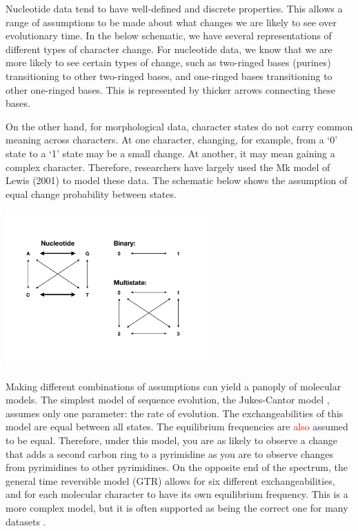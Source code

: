 \documentclass[11pt]{article}
\makeatletter
\newcommand{\edit}[1]{{\textcolor{red}{#1}}} %
\newenvironment{boxedtext}[1]{%
  \begin{mdframed}[frametitle=#1,
    frametitlefont=\scshape\mdseries\sffamily,
    frametitlealignment=\centering,
    backgroundcolor=black!20,
    hidealllines=true,
    innerleftmargin=11\p@,innerrightmargin=11\p@,
    frametitleaboveskip=0.5\baselineskip,
    innerbottommargin=0.5\baselineskip,
    skipabove=\baselineskip,skipbelow=0.5\baselineskip]
}{%
  \end{mdframed}%
}
\makeatother
\begin{document}
\begin{boxedtext}{Molecules and Morphology}

Nucleotide data tend to have well-defined and discrete properties.
This allows a range of assumptions to be made about what changes we are likely to see over evolutionary time.
In the below schematic, we have several representations of different types of character change.
For nucleotide data, we know that we are more likely to see certain types of change, such as two-ringed bases (purines) transitioning to other two-ringed bases, and one-ringed bases transitioning to other one-ringed bases.
This is represented by thicker arrows connecting these bases.

On the other hand, for morphological data, character states do not carry common meaning across characters.
At one character, changing, for example, from a `0' state to a `1' state may be a small change.
At another, it may mean gaining a complex character.
Therefore, researchers have largely used the Mk model of Lewis (2001) to model these data.
The schematic below shows the assumption of equal change probability between states.


 \includegraphics[height=6cm]{figures/Q.pdf}
\label{fig:Q}

\end{boxedtext}

Making different combinations of assumptions can yield a panoply of molecular models.
The simplest model of sequence evolution, the Jukes-Cantor model \cite{Jukes1969}, assumes only one parameter: the rate of evolution.
The exchangeabilities of this model are equal between all states. 
The equilibrium frequencies are \edit{also} assumed to be equal.
Therefore, under this model, you are as likely to observe a change that adds a second carbon ring to a pyrimidine as you are to observe changes from pyrimidines to other pyrimidines.
On the opposite end of the spectrum, the general time reversible model (GTR) \cite{Tavare1986} allows for six different exchangeabilities, and for each molecular character to have its own equilibrium frequency.
This is a more complex model, but it is often supported as being the correct one for many datasets \cite{abadi2019}.
\end{document}
